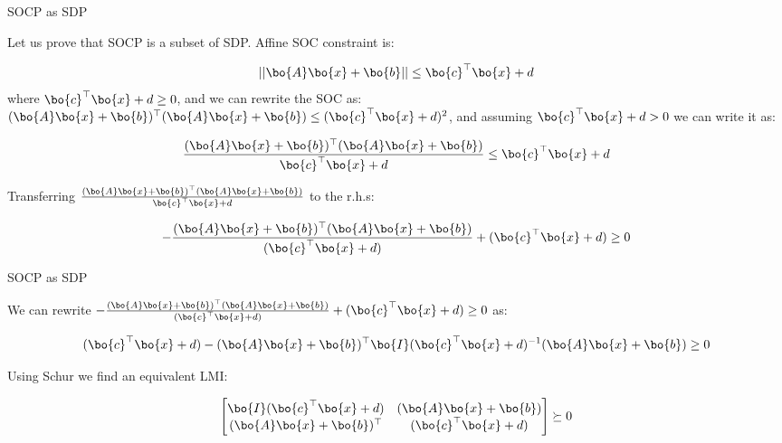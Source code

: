 \documentclass{beamer}
\begin{document}
\begin{frame}{SOCP as SDP}
	\begin{flushleft}
		
		Let us prove that SOCP is a subset of SDP. Affine SOC constraint is:
		
		\begin{equation}
			||\bo{A}\bo{x} + \bo{b}|| \leq \bo{c}^\top \bo{x} + d
		\end{equation}
		where $\bo{c}^\top \bo{x} + d \geq 0$, and we can rewrite the SOC as: $(\bo{A}\bo{x} + \bo{b})^\top (\bo{A}\bo{x} + \bo{b}) \leq (\bo{c}^\top \bo{x} + d)^2$, and assuming $\bo{c}^\top \bo{x} + d > 0$ we can write it as:
		
		\begin{equation}
			\frac{(\bo{A}\bo{x} + \bo{b})^\top (\bo{A}\bo{x} + \bo{b})}{\bo{c}^\top \bo{x} + d} \leq \bo{c}^\top \bo{x} + d
		\end{equation}
		
		Transferring $\frac{(\bo{A}\bo{x} + \bo{b})^\top (\bo{A}\bo{x} + \bo{b})}{\bo{c}^\top \bo{x} + d}$ to the r.h.s:
		
		\begin{equation}
			-\frac{(\bo{A}\bo{x} + \bo{b})^\top (\bo{A}\bo{x} + \bo{b})}{(\bo{c}^\top \bo{x} + d)} + (\bo{c}^\top \bo{x} + d) \geq 0
		\end{equation}
		
	\end{flushleft}
\end{frame}





\begin{frame}{SOCP as SDP}
	\begin{flushleft}
		
		We can rewrite $-\frac{(\bo{A}\bo{x} + \bo{b})^\top (\bo{A}\bo{x} + \bo{b})}{(\bo{c}^\top \bo{x} + d)} + (\bo{c}^\top \bo{x} + d) \geq 0$ as:
		
		\begin{equation}
			(\bo{c}^\top \bo{x} + d) - 
			(\bo{A}\bo{x} + \bo{b})^\top 
			\bo{I}(\bo{c}^\top \bo{x} + d)^{-1}
			(\bo{A}\bo{x} + \bo{b})
			\geq 0
		\end{equation}
		
		\bigskip
		
		Using Schur we find an equivalent LMI:
		
		\begin{equation}
			\begin{bmatrix}
				\bo{I}(\bo{c}^\top \bo{x} + d) & (\bo{A}\bo{x} + \bo{b}) \\
				(\bo{A}\bo{x} + \bo{b})^\top & (\bo{c}^\top \bo{x} + d)
			\end{bmatrix} \succeq 0
		\end{equation}
		
		
	\end{flushleft}
\end{frame}
\end{document}
